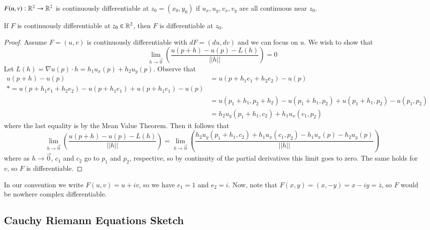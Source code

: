 \begin{definition}
    $F(u,v):\mathbb R^2\rightarrow \mathbb R^2$ is continuously differentiable at $z_0 = (x_0,y_0)$ if $u_x,u_y,v_x,v_y$ are all continuous near $z_0$.
\end{definition}

\begin{definition}
    If $F$ is continuously differentiable at $z_0 \in \mathbb R^2$, then $F$ is differentiable at $z_0$. 
\end{definition}
\begin{proof}
    Assume $F= (u,v)$ is continuously differentiable with $dF = (du,dv)$ and we can focus on $u$. We wish to show that \begin{equation*}
        \lim\limits_{h\rightarrow \vec{0}}\left(\frac{u(p+h)-u(p)-L(h)}{||h||}\right) = 0
    \end{equation*}
    Let $L(h) = \nabla u(p)\cdot h = h_1u_x(p)+h_2u_y(p)$. Observe that \begin{align*}
        u(p+h)-u(p) &= u(p+h_1e_1+h_2e_2)-u(p) \\
        *= u(p+h_1e_1+h_2e_2) - u(p+h_1e_1)+u(p+h_1e_1)-u(p) \\
        &= u(p_1+h_1,p_2+h_2) - u(p_1+h_1,p_2) + u(p_1+h_1,p_2) - u(p_1,p_2) \\
        &= h_2u_y(p_1+h_1,c_2) + h_1u_x(c_1,p_2)
    \end{align*}
    where the last equality is by the Mean Value Theorem. Then it follows that \begin{equation*}
        \lim\limits_{h\rightarrow \vec{0}}\left(\frac{u(p+h)-u(p)-L(h)}{||h||}\right) = \lim\limits_{h\rightarrow \vec{0}}\left(\frac{h_2u_y(p_1+h_1,c_2) + h_1u_x(c_1,p_2)-h_1u_x(p) - h_2u_y(p)}{||h||}\right) 
    \end{equation*}
    where as $h\rightarrow \vec{0}$, $c_1$ and $c_2$ go to $p_1$ and $p_2$, respective, so by continuity of the partial derivatives this limit goes to zero. The same holds for $v$, so $F$ is differentiable.
\end{proof}


In our convention we write $F(u,v) = u+iv$, so we have $e_1 = 1$ and $e_2 = i$. Now, note that $F(x,y) = (x,-y) = x-iy = \overline{z}$, so $F$ would be nowhere complex differentiable.


        

\subsection{Cauchy Riemann Equations Sketch}

